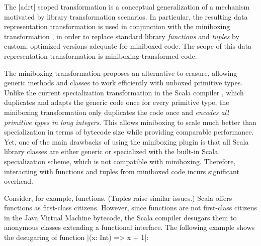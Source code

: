 The |adrt| scoped transformation is a conceptual generalization of a mechanism
motivated by library transformation scenarios. In particular, the
resulting data representation transformation is used in conjunction
with the miniboxing transformation \cite{miniboxing-www, miniboxing},
in order to replace standard library \emph{functions} and \emph{tuples}
by custom, optimized versions adequate for miniboxed code.
The scope of this data representation transformation is miniboxing-transformed code.


The miniboxing transformation \cite{miniboxing} proposes an alternative to erasure, allowing generic methods and classes to work efficiently with unboxed primitive types. Unlike the current specialization transformation in the Scala compiler \cite{iuli-thesis}, which duplicates and adapts the generic code once for every primitive type, the miniboxing transformation only duplicates the code once and \emph{encodes all primitive types in long integers}. This allows miniboxing to scale much better than specialization \cite{miniboxing-linkedlist} in terms of bytecode size while providing comparable performance. Yet, one of the main drawbacks of using the miniboxing plugin is that all Scala library classes are either generic or specialized with the built-in Scala specialization scheme, which is not compatible with miniboxing. Therefore, interacting with functions and tuples from miniboxed code incurs significant overhead.

Consider, for example, functions. (Tuples raise similar issues.) Scala offers functions as first-class citizens. However, since functions are not first-class citizens in the Java Virtual Machine bytecode, the Scala compiler desugars them to anonymous classes extending a functional interface. The following example shows the desugaring of function |(x: Int) => x + 1|:

